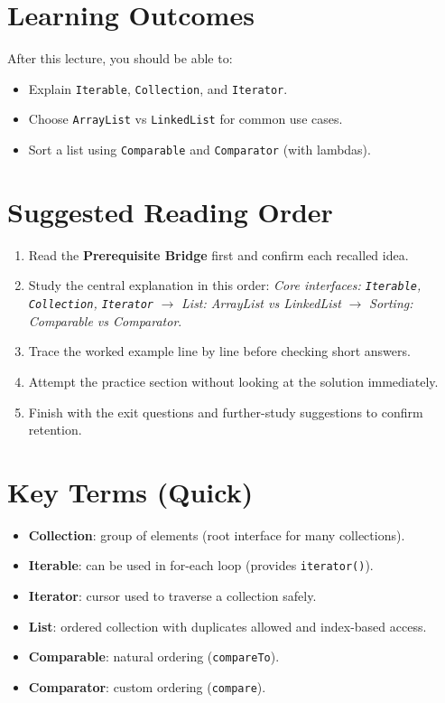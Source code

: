 \documentclass[11pt]{article}
\begin{document}
\section{Learning Outcomes}
After this lecture, you should be able to:
\begin{itemize}
  \item Explain \texttt{Iterable}, \texttt{Collection}, and \texttt{Iterator}.
  \item Choose \texttt{ArrayList} vs \texttt{LinkedList} for common use cases.
  \item Sort a list using \texttt{Comparable} and \texttt{Comparator} (with lambdas).
\end{itemize}

\section{Suggested Reading Order}
\begin{enumerate}
  \item Read the \textbf{Prerequisite Bridge} first and confirm each recalled idea.
  \item Study the central explanation in this order: \textit{Core interfaces: \texttt{Iterable}, \texttt{Collection}, \texttt{Iterator}} $\rightarrow$ \textit{List: ArrayList vs LinkedList} $\rightarrow$ \textit{Sorting: Comparable vs Comparator}.
  \item Trace the worked example line by line before checking short answers.
  \item Attempt the practice section without looking at the solution immediately.
  \item Finish with the exit questions and further-study suggestions to confirm retention.
\end{enumerate}
\notesources{\OOPSUnitVSources}

\section{Key Terms (Quick)}
\begin{itemize}
  \item \textbf{Collection}: group of elements (root interface for many collections).
  \item \textbf{Iterable}: can be used in for-each loop (provides \texttt{iterator()}).
  \item \textbf{Iterator}: cursor used to traverse a collection safely.
  \item \textbf{List}: ordered collection with duplicates allowed and index-based access.
  \item \textbf{Comparable}: natural ordering (\texttt{compareTo}).
  \item \textbf{Comparator}: custom ordering (\texttt{compare}).
\end{itemize}
\end{document}
